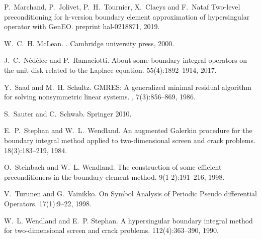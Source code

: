 \documentclass[]{report}
\begin{document}
\begin{small}
\begin{thebibliography}{0}
               
		P.~Marchand, P.~Jolivet, P.~H.~Tournier, X.~Claeys and F.~Nataf
		\newblock Two-level preconditioning for h-version boundary element approximation of hypersingular operator with GenEO.
		 preprint hal-0218871, 2019.

		
		W.~C.~H. McLean.
		.
		\newblock Cambridge university press, 2000.
		
		J.~C.~Nédélec and P.~Ramaciotti.
		\newblock About some boundary integral operators on the unit disk related to the Laplace equation.
		 55(4):1892--1914, 2017.
		
		
		Y.~Saad and M.~H. Schultz.
		\newblock GMRES: A generalized minimal residual algorithm for solving
		nonsymmetric linear systems.
		,
		7(3):856--869, 1986.
		
		S.~Sauter and C.~Schwab.
		\newblock Springer 2010.
		
		E.~P.~Stephan and W.~L.~Wendland.
		\newblock An augmented Galerkin procedure for the boundary integral method applied to two-dimensional screen and crack problems.
		 18(3):183--219, 1984.
		
		
		O.~Steinbach and W.~L. Wendland.
		\newblock The construction of some efficient preconditioners in the boundary
		element method.
		 9(1-2):191--216, 1998.
		
		V.~Turunen and G.~Vainikko.
		\newblock On Symbol Analysis of Periodic Pseudo differential Operators.
		 17(1):9--22, 1998.
		
		
		W.~L. Wendland and E.~P. Stephan.
		\newblock A hypersingular boundary integral method for two-dimensional screen and crack problems.
		 112(4):363--390, 1990.
		

		
		
	\end{thebibliography}
\end{small}
\end{document}
